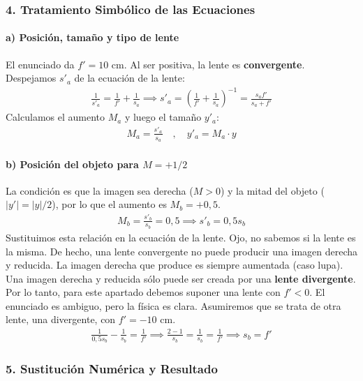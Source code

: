 \subsubsection*{4. Tratamiento Simbólico de las Ecuaciones}
\paragraph*{a) Posición, tamaño y tipo de lente}
El enunciado da $f' = 10$ cm. Al ser positiva, la lente es \textbf{convergente}.
Despejamos $s'_a$ de la ecuación de la lente:
\begin{gather}
    \frac{1}{s'_a} = \frac{1}{f'} + \frac{1}{s_a} \implies s'_a = \left(\frac{1}{f'} + \frac{1}{s_a}\right)^{-1} = \frac{s_a f'}{s_a + f'}
\end{gather}
Calculamos el aumento $M_a$ y luego el tamaño $y'_a$:
\begin{gather}
    M_a = \frac{s'_a}{s_a} \quad , \quad y'_a = M_a \cdot y
\end{gather}

\paragraph*{b) Posición del objeto para $M = +1/2$}
La condición es que la imagen sea derecha ($M>0$) y la mitad del objeto ($|y'|=|y|/2$), por lo que el aumento es $M_b = +0,5$.
\begin{gather}
    M_b = \frac{s'_b}{s_b} = 0,5 \implies s'_b = 0,5 s_b
\end{gather}
Sustituimos esta relación en la ecuación de la lente. Ojo, no sabemos si la lente es la misma. De hecho, una lente convergente no puede producir una imagen derecha y reducida. La imagen derecha que produce es siempre aumentada (caso lupa). Una imagen derecha y reducida sólo puede ser creada por una \textbf{lente divergente}. Por lo tanto, para este apartado debemos suponer una lente con $f' < 0$. El enunciado es ambiguo, pero la física es clara. Asumiremos que se trata de otra lente, una divergente, con $f'=-10$ cm.
\begin{gather}
    \frac{1}{0,5 s_b} - \frac{1}{s_b} = \frac{1}{f'} \implies \frac{2-1}{s_b} = \frac{1}{s_b} = \frac{1}{f'} \implies s_b = f'
\end{gather}

\subsubsection*{5. Sustitución Numérica y Resultado}
